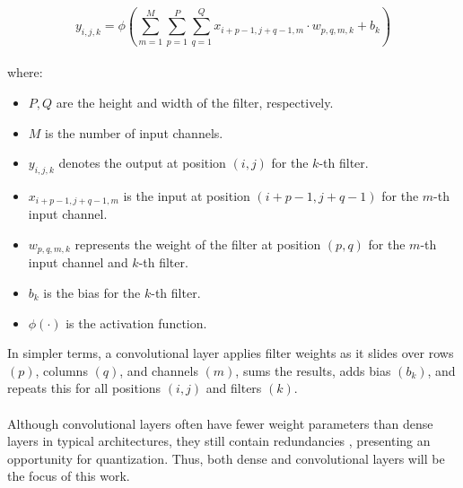 \[
y_{i,j,k} = \phi \left( \sum_{m=1}^M \sum_{p=1}^P \sum_{q=1}^Q x_{i+p-1, j+q-1, m} \cdot w_{p,q,m,k} + b_k \right)
\]
\\
\noindent where:
\begin{itemize}
  \item \( P, Q \) are the height and width of the filter, respectively.
  \item \( M \) is the number of input channels.
  \item \( y_{i,j,k} \) denotes the output at position \((i, j)\) for the \(k\)-th filter.
  \item \( x_{i+p-1, j+q-1, m} \) is the input at position \((i+p-1, j+q-1)\) for the \(m\)-th input channel.
  \item \( w_{p,q,m,k} \) represents the weight of the filter at position \((p, q)\) for the \(m\)-th input channel and \(k\)-th filter.
  \item \( b_k \) is the bias for the \(k\)-th filter.
  \item \( \phi(\cdot) \) is the activation function.
\end{itemize}

\noindent In simpler terms, a convolutional layer applies filter weights 
as it slides over rows \((p)\), columns \((q)\), and channels \((m)\), 
sums the results, adds bias \((b_k)\), 
and repeats this for all positions \((i, j)\) and filters \((k)\).
\\
\\
\noindent Although convolutional layers often have fewer weight parameters than dense layers in typical architectures, 
they still contain redundancies \cite{huang2017densely}, presenting an opportunity for quantization. 
Thus, both dense and convolutional layers will be the focus of this work.


